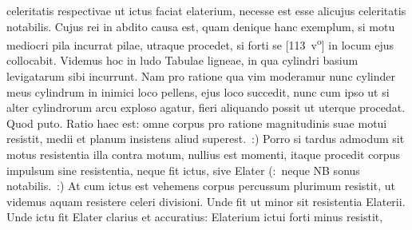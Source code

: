 celeritatis respectivae\protect{}
ut ictus\protect{} faciat elaterium,\protect{}
necesse est esse alicujus celeritatis notabilis.
Cujus rei in abdito causa est,
quam denique hanc
exemplum, si motu mediocri pila incurrat pilae,\protect{}
utraque procedet, si forti
se %
[113~v\textsuperscript{o}] %
%
in locum ejus collocabit.
Videmus hoc in ludo Tabulae ligneae, in qua cylindri
basium levigatarum sibi incurrunt.
Nam pro ratione qua vim moderamur
nunc cylinder meus cylindrum in inimici loco pellens,
ejus loco succedit,
nunc cum ipso
ut si alter cylindrorum arcu exploso agatur,
fieri aliquando possit ut uterque procedat.
Quod puto. Ratio haec est:
omne corpus pro ratione magnitudinis suae motui resistit,
medii 
et planum insistens aliud superest.~:)
Porro si tardus admodum sit motus resistentia illa contra motum,
nullius est momenti,
itaque procedit corpus impulsum sine resistentia,
neque fit ictus,\protect{}
sive Elater\protect{}
(:~neque NB sonus notabilis.~:)
At cum ictus est vehemens
corpus percussum plurimum resistit,
ut videmus aquam\protect{}
resistere celeri divisioni.
Unde fit ut minor sit resistentia Elaterii.
Unde ictu fit Elater clarius et accuratius:
Elaterium\protect{} ictui forti minus resistit,
